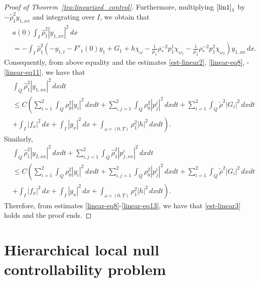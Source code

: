 \documentclass[11pt,a4paper]{amsart}
\numberwithin{equation}{section}
\begin{document}
\begin{proof}[Proof of Theorem~\ref{teo:linearized_control}]
\noindent Furthermore, multiplying   $\eqref{lin1}_{1}$  by  $-\hat{\rho}^{2}_{1}y_{1,xx}$ and  integrating over  $I$, we obtain  that
\begin{align*}
&a(0)\int_{I}\hat{\rho}^{2}_{1}|y_{1,xx}|^{2}\,dx\\
	& = -\int_{I}\hat{\rho}^{2}_{1}(-y_{1,t}-F'_{1}(0)y_{1} +G_{1}+h\chi_{\omega}-\frac{1}{\mu_{1}}\rho^{-2}_{\ast}p^{1}_{1} \chi_{\omega_{1}}-\frac{1}{\mu_{2}}\rho^{-2}_{\ast}p^{2}_{1}\chi_{\omega_{2}} )y_{1,xx}\,dx.
\end{align*}Consequently, from above equality and the estimates \eqref{est-linear2}, \eqref{linear-eq8}, -\eqref{linear-eq11}, we have that
\begin{equation}
\begin{split}
& \int_{Q}\hat{\rho}^{2}_{1}|y_{1,xx}|^{2}\,dxdt \\
&\leq C\left(   \sum_{i=1}^{2}\int_{Q}\rho^{2}_{0}|y_{i}|^{2}\,dxdt+\sum_{i,j=1}^{2}\int_{Q}\rho^{2}_{0}|p^{i}_{j}|^{2}\,dxdt+\sum_{i=1}^{2}\int_{Q}\tilde{\rho}^{2}|G_{i}|^{2}\,dxdt   \right. \\
& \left.+\int_{I}|f_{x}|^{2}\,dx+\int_{I}|g_{x}|^{2}\,dx+\int_{\omega\times (0,T)}\rho^{2}_{1}|h|^{2}\,dxdt\right).
\end{split}
\end{equation}Similarly,
\begin{equation}\label{linear-eq13}
\begin{split}
&\int_{Q}\hat{\rho}^{2}_{1}|y_{2,xx}|^{2}\,dxdt+\sum_{i,j=1}^{2}\int_{Q}\hat{\rho}^{2}_{1}|p^{i}_{j,xx}|^{2}\,dxdt\\
&\leq C\left(   \sum_{i=1}^{2}\int_{Q}\rho^{2}_{0}|y_{i}|^{2}\,dxdt+\sum_{i,j=1}^{2}\int_{Q}\rho^{2}_{0}|p^{i}_{j}|^{2}\,dxdt+\sum_{i=1}^{2}\int_{Q}\tilde{\rho}^{2}|G_{i}|^{2}\,dxdt   \right.\\
&\left.+\int_{I}|f_{x}|^{2}\,dx+\int_{I}|g_{x}|^{2}\,dx+\int_{\omega\times (0,T)}\rho^{2}_{1}|h|^{2}\,dxdt\right).
\end{split}
\end{equation}Therefore, from estimates \eqref{linear-eq8}-\eqref{linear-eq13}, we have that \eqref{est-linear3}  holds and the proof ends. 



\end{proof}

\section{\bf Hierarchical local null controllability problem}\label{sec:qlinear}
\end{document}
